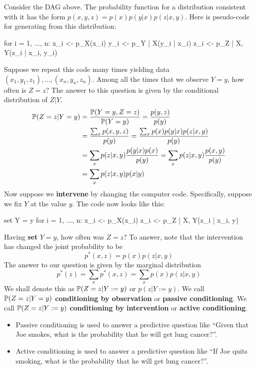Consider the DAG above. The probability function for a distribution
consistent with it has the form \(p(x, y, z) = p(x)p(y | x)p(z| x, y)\).
Here is pseudo-code for generating from this distribution:
\begin{console}
for i = 1, ..., n:
  x_i <- p_{X}(x_{i})
  y_i <- p_{Y | X}(y_{i} | x_{i})
  z_i <- p_{Z | X, Y}(z_{i} | x_{i}, y_{i})
\end{console}
Suppose we repeat this code many times yielding data
\((x_{1}, y_{1}, z_{1}), \dots, (x_{n}, y_{n}, z_{n})\). Among all the times that we
observe \(Y = y\), how often is \(Z = z\)? The answer to this question
is given by the conditional distribution of \(Z | Y\).
\begin{align*}
\operatorname{\mathbb{P}}(Z = z | Y = y) &= \frac{\operatorname{\mathbb{P}}(Y = y, Z = z)}{\operatorname{\mathbb{P}}(Y = y)} = \frac{p(y, z)}{p(y)} \\
&= \frac{\sum_x p(x, y, z)}{p(y)} = \frac{\sum_x p(x) p(y | x) p(z | x, y)}{p(y)} \\
&= \sum_x p(z | x, y) \frac{p(y | x) p(x)}{p(y)} = \sum_x p(z | x, y) \frac{p(x, y)}{p(y)} \\
&= \sum_x p(z | x, y) p(x | y)
\end{align*}
Now suppose we \textbf{intervene} by changing the computer code.
Specifically, suppose we fix \(Y\) at the value \(y\). The code now
looks like this:
\begin{console}
set Y = y
for i = 1, ..., n:
  x_i <- p_{X}(x_{i})
  z_i <- p_{Z | X, Y}(z_{i} | x_{i}, y)
\end{console}
Having \textbf{set} \(Y = y\), how often was \(Z = z\)? To answer, note
that the intervention has changed the joint probability to be
\[
p^{*}(x, z) = p(x) p(z | x, y)
\]
The answer to our question is given by the marginal distribution
\[
p^{*}(z) = \sum_x p^{*}(x, z) = \sum_x p(x) p(z | x, y)
\]
We shall denote this as \(\operatorname{\mathbb{P}}(Z = z | Y := y)\) or
\(p(z | Y := y)\). We call \(\operatorname{\mathbb{P}}(Z = z | Y = y)\)
\textbf{conditioning by observation} or \textbf{passive conditioning}.
We call \(\operatorname{\mathbb{P}}(Z = z | Y := y)\) \textbf{conditioning by
intervention} or \textbf{active conditioning}.
\begin{itemize}[tightlist]
\item
  Passive conditioning is used to answer a predictive question like
  ``Given that Joe smokes, what is the probability that he will get lung
  cancer?''.
\item
  Active conditioning is used to answer a predictive question like ``If
  Joe quits smoking, what is the probability that he will get lung
  cancer?''.
\end{itemize}
